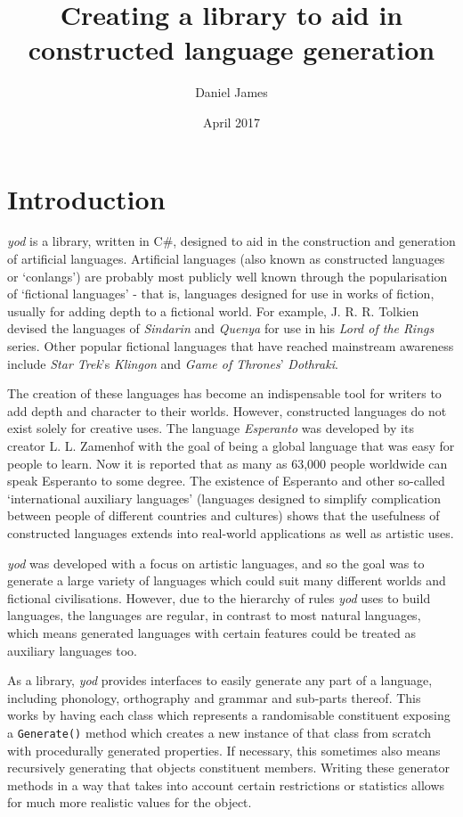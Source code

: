 \documentclass{report}
\title{Creating a library to aid in constructed language generation}
\author{Daniel James}
\date{April 2017}
\newcommand{\Csh}{C{\lserif\#}}
\begin{document}
   \maketitle
   
   \chapter{Introduction}
   \textit{yod} is a library, written in \Csh{}, designed to aid in the construction and generation of artificial languages. Artificial languages (also known as constructed languages or `conlangs') are probably most publicly well known through the popularisation of `fictional languages' - that is, languages designed for use in works of fiction, usually for adding depth to a fictional world. For example, J. R. R. Tolkien devised the languages of \textit{Sindarin} and \textit{Quenya} for use in his \textit{Lord of the Rings} series. Other popular fictional languages that have reached mainstream awareness include \textit{Star Trek}'s \textit{Klingon} and \textit{Game of Thrones}' \textit{Dothraki}.
   
   The creation of these languages has become an indispensable tool for writers to add depth and character to their worlds. However, constructed languages do not exist solely for creative uses. The language \textit{Esperanto} was developed by its creator L. L. Zamenhof with the goal of being a global language that was easy for people to learn\cite{unualibro}. Now it is reported that as many as 63,000 people worldwide can speak Esperanto to some degree\cite{esperanto}. The existence of Esperanto and other so-called `international auxiliary languages' (languages designed to simplify complication between people of different countries and cultures) shows that the usefulness of constructed languages extends into real-world applications as well as artistic uses.
   
   \textit{yod} was developed with a focus on artistic languages, and so the goal was to generate a large variety of languages which could suit many different worlds and fictional civilisations. However, due to the hierarchy of rules \textit{yod} uses to build languages, the languages are regular, in contrast to most natural languages, which means generated languages with certain features could be treated as auxiliary languages too.
   
   As a library, \textit{yod} provides interfaces to easily generate any part of a language, including phonology, orthography and grammar and sub-parts thereof. This works by having each class which represents a randomisable constituent exposing a \texttt{Generate()} method which creates a new instance of that class from scratch with procedurally generated properties. If necessary, this sometimes also means recursively generating that objects constituent members. Writing these generator methods in a way that takes into account certain restrictions or statistics allows for much more realistic values for the object.
   
\end{document}
